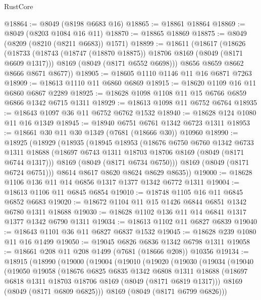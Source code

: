 \begin{lexlean}{RustCore}
\begin{coremodule}
@18864 := @8049 (@8198 @6683 @16)
@18865 := @18861 @18864
@18869 := @8049 (@8203 @1084 @16 @11)
@18870 := @18865 @18869
@18875 := @8049 (@8209 (@8210 (@8211 @6683)) @1571)
@18899 := @18611
    (@18617
      (@18626
        (@18733
          (@18743 (@18747 (@18870 @18875)) @18706 @8169 (@8049 (@8171 @6609 @1317)))
          @8169
          (@8049 (@8171 @6552 @6698)))
        @8656
        @8659
        @8662
        @8666
        @8671
        @8677))
@18905 := @18605 @1110 @1146 @11 @16 @6871 @7263
@18909 := @18613 @1110 @11 @6860 @6869
@18915 := @18620 @1109 @16 @11 @6860 @6867 @2289
@18925 := @18628 @1098 @1108 @11 @15 @6766 @6859 @6866 @1342 @6715 @1311
@18929 := @18613 @1098 @11 @6752 @6764
@18935 := @18643 @1097 @36 @11 @6752 @6762 @1532
@18940 := @18628 @124 @1080 @11 @16 @1349
@18945 := @18940 @6751 @6761 @1342 @6723 @1311
@18953 := @18661 @30 @11 @30 @1349 (@7681 (@18666 @30)) @10960
@18990 := @18925
    (@18929
      (@18935
        (@18945
          @18953
          (@18676
            @6750
            @6760
            @1342
            @6733
            @1311
            @18688
            (@18697 @6743 @1311 @18703 @18706 @8169 (@8049 (@8171 @6744 @1317)))
            @8169
            (@8049 (@8171 @6734 @6750)))
          @8169
          (@8049 (@8171 @6724 @6751)))
        @8614
        @8617
        @8620
        @8624
        @8629
        @8635))
@19000 := @18628 @1106 @136 @11 @14 @6856 @1317 @1377 @1342 @6772 @1311
@19004 := @18613 @1106 @11 @6845 @6854
@19010 := @18748 @1105 @16 @11 @6845 @6852 @6683
@19020 := @18672 @1104 @11 @15 @1426 @6844 @6851 @1342 @6780 @1311 @18688
@19030 := @18628 @1102 @136 @11 @14 @6841 @1317 @1377 @1342 @6790 @1311
@19034 := @18613 @1102 @11 @6827 @6839
@19040 := @18643 @1101 @36 @11 @6827 @6837 @1532
@19045 := @18628 @239 @1080 @11 @16 @1499
@19050 := @19045 @6826 @6836 @1342 @6798 @1311
@19058 := @18661 @208 @11 @208 @1499 (@7681 (@18666 @208)) @10356
@19134 := @18915
    (@18990
      (@19000
        (@19004
          (@19010
            (@19020
              (@19030
                (@19034
                  (@19040
                    (@19050
                      @19058
                      (@18676
                        @6825
                        @6835
                        @1342
                        @6808
                        @1311
                        @18688
                        (@18697 @6818 @1311 @18703 @18706 @8169 (@8049 (@8171 @6819 @1317)))
                        @8169
                        (@8049 (@8171 @6809 @6825)))
                      @8169
                      (@8049 (@8171 @6799 @6826)))

\end{coremodule}
\end{lexlean}
